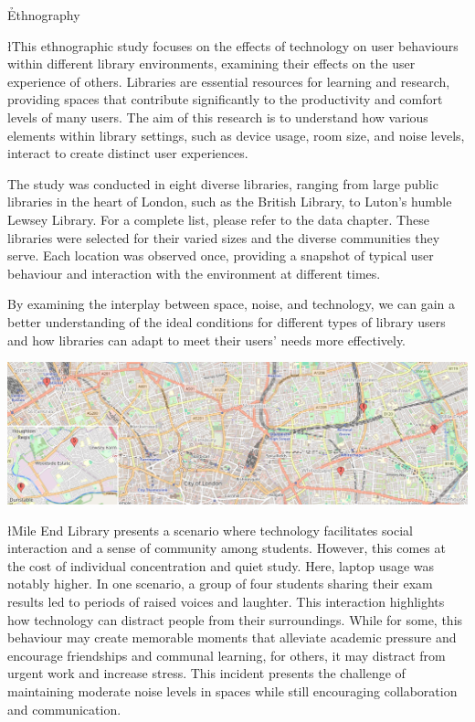 \documentclass{novel}
\title     {}
\subtitle  {}
\begin{document}
\toc

\h{Ethnography}

\l{T}his ethnographic study focuses on the effects of technology on user behaviours within different library environments, examining their effects on the user experience of others. Libraries are essential resources for learning and research, providing spaces that contribute significantly to the productivity and comfort levels of many users. The aim of this research is to understand how various elements within library settings, such as device usage, room size, and noise levels, interact to create distinct user experiences.

The study was conducted in eight diverse libraries, ranging from large public libraries in the heart of London, such as the British Library, to Luton's humble Lewsey Library. For a complete list, please refer to the data chapter. These libraries were selected for their varied sizes and the diverse communities they serve. Each location was observed once, providing a snapshot of typical user behaviour and interaction with the environment at different times.

By examining the interplay between space, noise, and technology, we can gain a better understanding of the ideal conditions for different types of library users and how libraries can adapt to meet their users' needs more effectively.

\noindent
\includegraphics[width=\textwidth]{resources/Map2.png}

\clearpage
{}
\l{M}ile End Library presents a scenario where technology facilitates social interaction and a sense of community among students. However, this comes at the cost of individual concentration and quiet study. Here, laptop usage was notably higher. In one scenario, a group of four students sharing their exam results led to periods of raised voices and laughter. This interaction highlights how technology can distract people from their surroundings. While for some, this behaviour may create memorable moments that alleviate academic pressure and encourage friendships and communal learning, for others, it may distract from urgent work and increase stress. This incident presents the challenge of maintaining moderate noise levels in spaces while still encouraging collaboration and communication.
\end{document}
